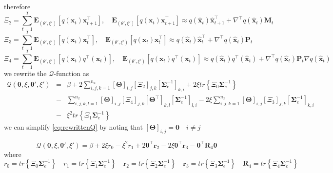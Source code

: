 \documentclass[]{article}
\begin{document}
therefore
\begin{equation}
 \Xi_2=\sum_{t=1}^{T}\mathbf E_{(\theta',\xi')}[q(\mathbf x_t)\mathbf x_{t+1}^\top ], \quad \mathbf E_{(\theta',\xi')}[q(\mathbf x_t)\mathbf x_{t+1}^\top ]\approx q(\mathbf{ \hat x}_t)\mathbf{ \hat x}_{t+1}^\top+\nabla^\top q(\mathbf{ \hat x}_t)\mathbf M_t
\end{equation}
\begin{equation}
 \Xi_3=\sum_{t=1}^{T}\mathbf E_{(\theta',\xi')}[q(\mathbf x_t)\mathbf x_{t}^\top ], \quad \mathbf E_{(\theta',\xi')}[q(\mathbf x_t)\mathbf x_{t}^\top ]\approx q(\mathbf{ \hat x}_t)\mathbf{ \hat x}_{t}^\top+\nabla^\top q(\mathbf{ \hat x}_t)\mathbf P_t
\end{equation}
\begin{equation}
 \Xi_4=\sum_{t=1}^{T}\mathbf E_{(\theta',\xi')}[q(\mathbf x_t)q^\top(\mathbf x_t) ], \quad \mathbf E_{(\theta',\xi')}[q(\mathbf x_t)q^\top(\mathbf x_t) ] \approx q(\mathbf{ \hat x}_t)q^\top(\mathbf{ \hat x}_t)+\nabla^\top q(\mathbf{ \hat x}_t)\mathbf P_t\nabla q(\mathbf{ \hat x}_t)
\end{equation}
we rewrite the $\mathcal Q$-function as
\begin{eqnarray}\label{eq:rewrittenQ}
 \mathcal Q(\boldsymbol \theta,\xi,\boldsymbol\theta',\xi')&=&\beta+2  \sum_{i,j,k=1}^{n_x}[\boldsymbol\Theta]_{i,j}[\Xi_2]_{j,k}[\boldsymbol\Sigma_e^{-1}]_{k,i} +2\xi tr \left\lbrace  \Xi_0\boldsymbol\Sigma_e^{-1}\right\rbrace  \nonumber \\
&-& \sum_{i,j,k,l=1}^{n_x}[\boldsymbol\Theta]_{i,j}[\Xi_4]_{j,k}[ \boldsymbol\Theta^\top]_{k,l}[\boldsymbol\Sigma_e^{-1}]_{l,i} -2\xi \sum_{i,j,k=1}^{n_x}[\boldsymbol\Theta]_{i,j}[\Xi_3]_{j,k}[\boldsymbol\Sigma_e^{-1}]_{k,i}  \nonumber \\
&-&\xi^2 tr \left\lbrace \Xi_1\boldsymbol\Sigma_e^{-1}\right\rbrace  
\end{eqnarray}
we can simplify \eqref{eq:rewrittenQ} by noting that $[\boldsymbol \Theta]_{i,j}=\mathbf 0 \quad i \neq j$ 

\begin{equation}
 \mathcal Q(\boldsymbol \theta,\xi,\boldsymbol\theta',\xi')=\beta +2\xi r_0 -\xi^2 r_1 +2 \boldsymbol\theta^\top \mathbf r_2-2\xi \boldsymbol\theta^\top \mathbf r_3  -\boldsymbol\theta^\top\mathbf R_4\boldsymbol\theta 
\end{equation}
where 
\begin{equation}
 r_0=tr \left\lbrace  \Xi_0\boldsymbol\Sigma_e^{-1}\right\rbrace   \quad r_1=tr \left\lbrace \Xi_1\boldsymbol\Sigma_e^{-1}\right\rbrace \quad
 \mathbf r_2=tr\left\lbrace \Xi_2\boldsymbol\Sigma_e^{-1}\right\rbrace \quad  \mathbf r_3= tr \left\lbrace \Xi_3\boldsymbol\Sigma_e^{-1}\right\rbrace \quad \mathbf R_4= tr \left\lbrace\Xi_4 \boldsymbol\Sigma_e^{-1}\right\rbrace\nonumber 
\end{equation}
\end{document}
